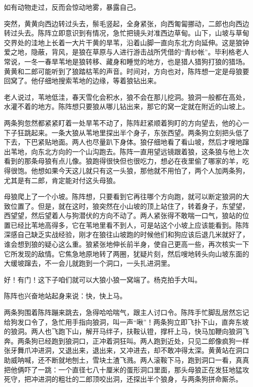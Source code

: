 \par 如有动物走过，反而会惊动地雾，暴露自己。
\par 突然，黄黄向西边转过头去，鬃毛竖起，全身紧张，向西匍匐挪动，二郎也向西边转过头去。陈阵立即意识到有情况，急忙把镜头对准西边草甸。山下，山坡与草甸交界处的洼地上长着一大片干黄的旱苇，沿着山脚一直向东北方向延伸。这是狼钟爱之地，隐蔽，背风，是狼在草原与人进行游击战所凭借的“青纱帐”。毕利格老人常说，一冬一春旱苇地是狼转移、藏身和睡觉的地方，也是猎人猎狗打狼的猎场。黄黄和二郎可能听到了狼踏枯苇的声音。时间对，方向也对，陈阵想一定是母狼要回窝了。他仔细地搜索苇地的边缘，等着狼钻出来。
\par 老人说过，苇地低洼，春天雪化会积水，狼不会在那儿挖洞。狼洞一般都在高处，水灌不着的地方。陈阵想只要狼从哪儿钻出来，那它的窝一定就在附近的山坡上。
\par 两条狗忽然都紧紧盯着一处旱苇不动了，陈阵赶紧顺着狗盯的方向望去，他的心一下子狂跳起来。一条大狼从苇地里探出半个身子，东张西望。两条狗立刻把头低了下去，下巴紧贴地面。两人也尽量趴下身体。狼仔细地看了看山坡，然后才嗖地蹿出苇地，向东北方向的一个山沟跑去。陈阵一直用望远镜跟着狼，这条狼与他上次看到的那条母狼有点儿像。狼跑得很快但也很吃力，想必在夜里偷了哪家的羊，吃得很饱。他想如果今天这儿就只有这一头狼，那他就不用怕了，两个人加两条狗，尤其是有二郎，肯定能对付这头母狼。
\par 母狼爬上了一个小坡。陈阵想，只要看到它再往哪个方向跑，就可以断定狼洞的大致位置了。但是，就在这时，狼突然在小山坡的顶上站住了，转着身子，东望望，西望望，然后望着人与狗潜伏的方向不动了。两人紧张得不敢喘一口气，狼站的位置已经比苇地高得多，它在苇地里看不到人，可是站这个小坡上应该能看到。陈阵深感自己缺乏实战经验，刚才在狼往山坡跑的时候他们和狗应该后退几米就好了，谁会想到狼的疑心这么重。狼紧张地伸长前半身，使自己更高一些，再次核实一下它所发现的敌情。它焦急地原地转了两圈，犹疑片刻，然后嗖地转头向山坡东面的大缓坡蹿去，不一会儿就跑到一个洞口，一头扎进洞里。
\par 好！有门！这下子咱们就可以大狼小狼一窝端了。杨克拍手大叫。
\par 陈阵也兴奋地站起身来说：快，快上马。
\par 两条狗围着陈阵蹦来跳去，急得哈哈喘气，跟主人讨口令。陈阵手忙脚乱居然忘记给狗发口令了，急忙用手指向狼洞，叫一声“啾”！两条狗立即飞扑下山，直奔东坡的狼洞。两人也飞跑下山，解开马绊子，扶鞍认镫，撑杆上马，快马加鞭向狼洞飞奔。两条狗已经跑到狼洞口，正冲着洞狂叫。两人跑到近处，只见二郎像疯狗一样张牙舞爪冲进洞，又退出来，退出来，又冲进去，却不敢冲得太深。黄黄站在洞口助威呐喊，还不断就地刨土，雪块土渣飞溅。两人滚鞍下马，跑到洞口一看，真真把他俩吓了一跳：一个直径七八十厘米的蛋形洞口里面，那头母狼正在发狂地猛攻死守，把冲进洞的粗壮的二郎顶咬出洞，还探出半个狼身，与两条狗拼命厮杀。
